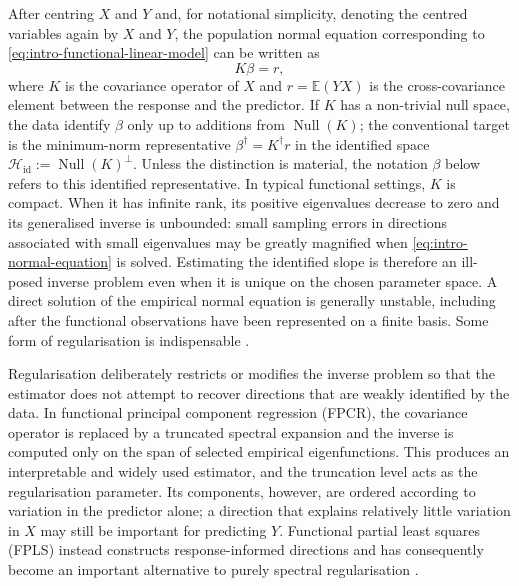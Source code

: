After centring $X$ and $Y$ and, for notational simplicity, denoting the centred
variables again by $X$ and $Y$, the population normal equation corresponding to
\eqref{eq:intro-functional-linear-model} can be written as
\begin{equation}
    K\beta=r,
    \label{eq:intro-normal-equation}
\end{equation}
where $K$ is the covariance operator of $X$ and $r=\mathbb{E}(YX)$ is the
cross-covariance element between the response and the predictor.  If $K$ has a
non-trivial null space, the data identify $\beta$ only up to additions from
$\operatorname{Null}(K)$; the conventional target is the minimum-norm
representative $\beta^\dagger=K^\dagger r$ in the identified space
$\mathcal H_{\mathrm{id}}:=\operatorname{Null}(K)^\perp$.  Unless the distinction is material, the
notation $\beta$ below refers to this identified representative.  In typical
functional settings, $K$ is compact.  When it has infinite rank, its positive
eigenvalues decrease to zero and its generalised inverse is unbounded: small
sampling errors in directions associated with small eigenvalues may be greatly
magnified when \eqref{eq:intro-normal-equation} is solved.  Estimating the
identified slope is therefore an ill-posed inverse problem even when it is
unique on the chosen parameter space.  A direct
solution of the empirical normal equation is generally unstable, including
after the functional observations have been represented on a finite basis.
Some form of regularisation is indispensable
\parencite{engl_hanke_neubauer_1996,hall_horowitz_2007}.

Regularisation deliberately restricts or modifies the inverse problem so that the estimator does not attempt to recover directions that are weakly identified by the data. In functional principal component regression (FPCR), the covariance operator is replaced by a truncated spectral expansion and the inverse is computed only on the span of selected empirical eigenfunctions. This produces an interpretable and widely used estimator, and the truncation level acts as the regularisation parameter. Its components, however, are ordered according to variation in the predictor alone; a direction that explains relatively little variation in $X$ may still be important for predicting $Y$. Functional partial least squares (FPLS) instead constructs response-informed directions and has consequently become an important alternative to purely spectral regularisation \parencite{preda_saporta_2005,delaigle_hall_2012,febrero_bande_et_al_2017}.

